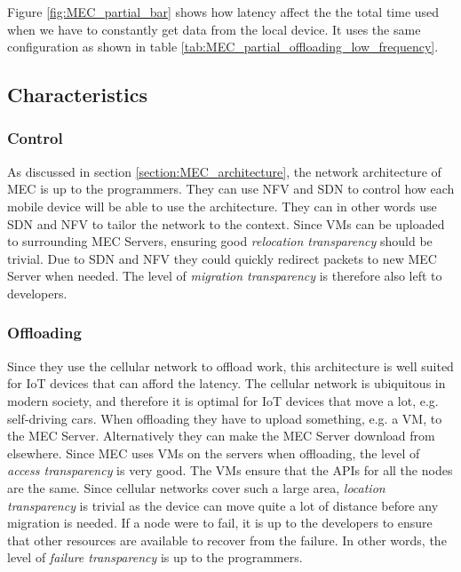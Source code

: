 Figure \ref{fig:MEC_partial_bar} shows how latency affect the the total time used when we have to constantly get data from the local device. It uses the same configuration as shown in table \ref{tab:MEC_partial_offloading_low_frequency}.





\subsection{Characteristics}

\subsubsection{Control}
As discussed in section \ref{section:MEC_architecture}, the network architecture of MEC is up to the programmers. They can use NFV and SDN to control how each mobile device will be able to use the architecture. They can in other words use SDN and NFV to tailor the network to the context. Since VMs can be uploaded to surrounding MEC Servers, ensuring good \textit{relocation transparency} should be trivial. Due to SDN and NFV they could quickly redirect packets to new MEC Server when needed. The level of \textit{migration transparency} is therefore also left to developers.

\subsubsection{Offloading}
Since they use the cellular network to offload work, this architecture is well suited for IoT devices that can afford the latency. The cellular network is ubiquitous in modern society, and therefore it is optimal for IoT devices that move a lot, e.g. self-driving cars. When offloading they have to upload something, e.g. a VM, to the MEC Server. Alternatively they can make the MEC Server download from elsewhere. Since MEC uses VMs on the servers when offloading, the level of \textit{access transparency} is very good. The VMs ensure that the APIs for all the nodes are the same. Since cellular networks cover such a large area, \textit{location transparency} is trivial as the device can move quite a lot of distance before any migration is needed. If a node were to fail, it is up to the developers to ensure that other resources are available to recover from the failure. In other words, the level of \textit{failure transparency} is up to the programmers.

